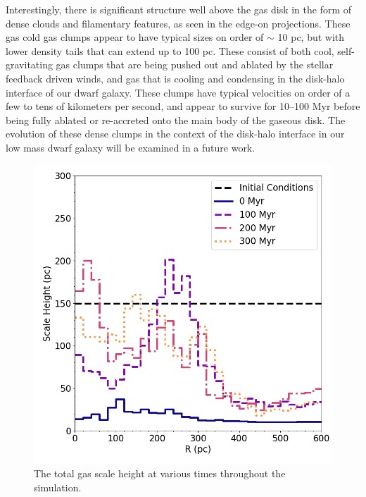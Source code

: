 \documentclass[twocolumn]{aastex61}
\begin{document}
Interestingly, there is significant structure well above the gas disk in the form of dense clouds and filamentary features, as seen in the edge-on projections. These gas cold gas clumps appear to have typical sizes on order of $\sim$ 10 pc, but with lower density tails that can extend up to 100 pc. These consist of both cool, self-gravitating gas clumps that are being pushed out and ablated by the stellar feedback driven winds, and gas that is cooling and condensing in the disk-halo interface of our dwarf galaxy. These clumps have typical velocities on order of a few to tens of kilometers per second, and appear to survive for 10--100 Myr before being fully ablated or re-accreted onto the main body of the gaseous disk. The evolution of these dense clumps in the context of the disk-halo interface in our low mass dwarf galaxy will be examined in a future work. 

\begin{figure}
\centering
\includegraphics[width=0.975\linewidth]{scale_height}
\caption{The total gas scale height at various times throughout the simulation.}
\label{fig:scale_height}
\end{figure}
\end{document}

